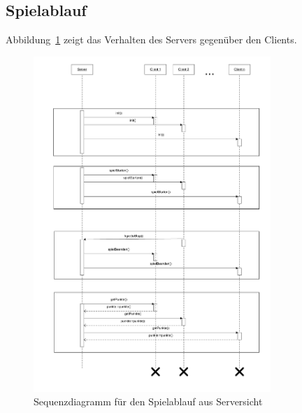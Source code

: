 \newpage

\subsection{Spielablauf}

Abbildung~\ref{SequenzdiagramServer} zeigt das Verhalten des Servers gegenüber den Clients.

\begin{figure}[H]
  \centering
  \includegraphics[width=0.80\textwidth,angle=0]{graphics/Spielablauf_Sequenzdiagramm.pdf}
  \caption{Sequenzdiagramm für den Spielablauf aus Serversicht\hfill{} }
  \label{SequenzdiagramServer}
\end{figure} 

